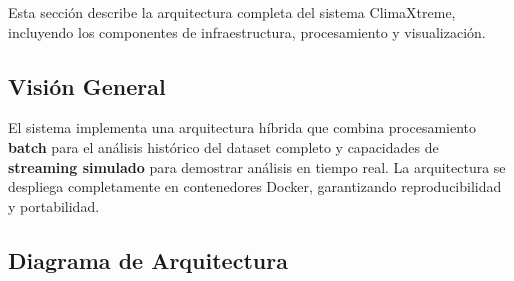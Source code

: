 \documentclass[12pt,a4paper]{scrartcl}
\begin{document}
Esta sección describe la arquitectura completa del sistema ClimaXtreme, incluyendo los componentes de infraestructura, procesamiento y visualización.

\subsection{Visión General}

El sistema implementa una arquitectura híbrida que combina procesamiento \textbf{batch} para el análisis histórico del dataset completo y capacidades de \textbf{streaming simulado} para demostrar análisis en tiempo real. La arquitectura se despliega completamente en contenedores Docker, garantizando reproducibilidad y portabilidad.

\subsection{Diagrama de Arquitectura}
\end{document}
